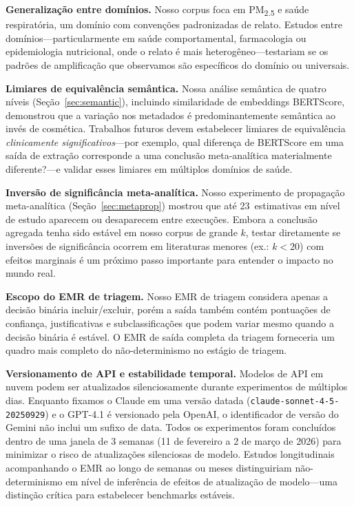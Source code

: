 \documentclass[12pt, a4paper]{article}
\begin{document}
\textbf{Generalização entre domínios.}
Nosso corpus foca em PM\textsubscript{2.5} e saúde respiratória, um domínio com convenções padronizadas de relato.
Estudos entre domínios---particularmente em saúde comportamental, farmacologia ou epidemiologia nutricional, onde o relato é mais heterogêneo---testariam se os padrões de amplificação que observamos são específicos do domínio ou universais.

\textbf{Limiares de equivalência semântica.}
Nossa análise semântica de quatro níveis (Seção~\ref{sec:semantic}), incluindo similaridade de embeddings BERTScore, demonstrou que a variação nos metadados é predominantemente semântica ao invés de cosmética.
Trabalhos futuros devem estabelecer limiares de equivalência \emph{clinicamente significativos}---por exemplo, qual diferença de BERTScore em uma saída de extração corresponde a uma conclusão meta-analítica materialmente diferente?---e validar esses limiares em múltiplos domínios de saúde.

\textbf{Inversão de significância meta-analítica.}
Nosso experimento de propagação meta-analítica (Seção~\ref{sec:metaprop}) mostrou que até 23~estimativas em nível de estudo aparecem ou desaparecem entre execuções.
Embora a conclusão agregada tenha sido estável em nosso corpus de grande $k$, testar diretamente se inversões de significância ocorrem em literaturas menores (ex.: $k{<}20$) com efeitos marginais é um próximo passo importante para entender o impacto no mundo real.

\textbf{Escopo do EMR de triagem.}
Nosso EMR de triagem considera apenas a decisão binária incluir/excluir, porém a saída também contém pontuações de confiança, justificativas e subclassificações que podem variar mesmo quando a decisão binária é estável.
O EMR de saída completa da triagem forneceria um quadro mais completo do não-determinismo no estágio de triagem.

\textbf{Versionamento de API e estabilidade temporal.}
Modelos de API em nuvem podem ser atualizados silenciosamente durante experimentos de múltiplos dias.
Enquanto fixamos o Claude em uma versão datada (\texttt{claude-sonnet-4-5-20250929}) e o GPT-4.1 é versionado pela OpenAI, o identificador de versão do Gemini não inclui um sufixo de data.
Todos os experimentos foram concluídos dentro de uma janela de 3 semanas (11 de fevereiro a 2 de março de 2026) para minimizar o risco de atualizações silenciosas de modelo.
Estudos longitudinais acompanhando o EMR ao longo de semanas ou meses distinguiriam não-determinismo em nível de inferência de efeitos de atualização de modelo---uma distinção crítica para estabelecer benchmarks estáveis.
\end{document}
